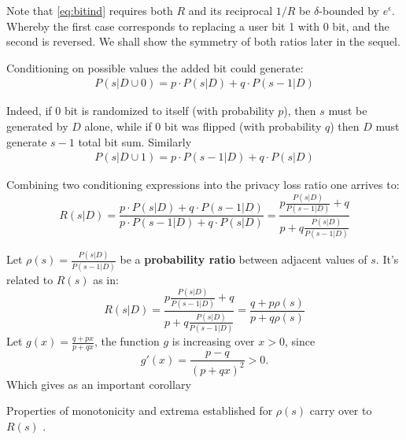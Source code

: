 \documentclass[11pt]{article}
\begin{document}
Note that \ref{eq:bitind} requires both $R$ and its reciprocal $1/R$ be $\delta$-bounded by $e^\epsilon$. Whereby the first case corresponds to replacing a user bit 1 with 0 bit, and the second is reversed. We shall show the symmetry of both ratios later in the sequel. 

Conditioning on possible values the added bit could generate:
\begin{align}\label{lem:rs100}
P(s|D \cup 0) = p \cdot P(s | D ) + q \cdot P( s - 1 | D) 
\end{align}

Indeed, if $0$ bit is randomized to itself (with probability $p$), then $s$ must be generated by $D$ alone, while if $0$ bit was flipped (with probability $q$) then $D$ must generate $s-1$ total bit sum. Similarly 
\begin{align}
P(s|D \cup 1) = p  \cdot P(s -1 | D ) + q \cdot P( s  | D) 
\end{align}

Combining two conditioning expressions into the privacy loss ratio one arrives to:
\begin{equation} \label{eq:plratio}
R(s|D)=  \frac{p \cdot P(s | D ) + q \cdot P( s - 1 | D) } {  p  \cdot P(s -1 | D ) + q \cdot P( s  | D)  } = \frac{ p \frac{P(s | D )}{P(s - 1| D )} + q } { p + q \frac{P(s | D )}{P(s - 1| D )} }
\end{equation}

Let $\rho(s) = \frac{P(s | D )}{P(s - 1| D )}$ be a \textbf{probability ratio} between adjacent values of $s$.  It's related to $R(s)$ as in:
\begin{equation} \label{eq:plratio1}
R(s|D) =  \frac{ p \frac{P(s | D )}{P(s - 1| D )} + q } { p + q \frac{P(s | D )}{P(s - 1| D )} } = \frac{q + p\rho(s)}{p + q\rho(s)}
\end{equation}
Let $g(x) = \frac{q + px}{p + qx}$, the function $g$ is increasing over $x>0$, since
\[ g'(x) = \frac{p-q}{(p+qx)^2} > 0. \]
Which gives as an important corollary 
\begin{cor}\label{cr:phr} Properties of monotonicity and extrema established for $\rho(s)$  carry over to $R(s)$ .
\end{cor}
 
\end{document}
